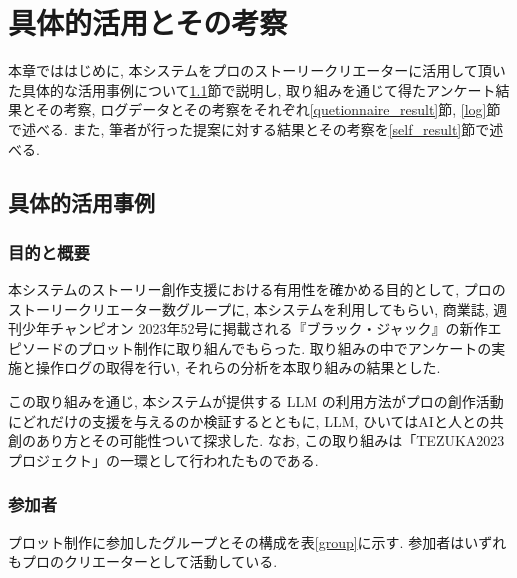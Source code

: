\documentclass[a4j,12pt]{jsreport}
\begin{document}
\pagestyle{fancy}
\lhead{\rightmark}
\renewcommand{\chaptermark}[1]{\markboth{第\ \thechapter\ 章\ #1}{}}
\fi

\chapter{具体的活用とその考察}\label{chap:experiment}
本章でははじめに, 本システムをプロのストーリークリエーターに活用して頂いた具体的な活用事例について\ref{example}節で説明し, 取り組みを通じて得たアンケート結果とその考察, ログデータとその考察をそれぞれ\ref{quetionnaire_result}節, \ref{log}節で述べる. また, 筆者が行った提案に対する結果とその考察を\ref{self_result}節で述べる.
\section{具体的活用事例}\label{example}
\subsection{目的と概要}\label{outline}
本システムのストーリー創作支援における有用性を確かめる目的として, プロのストーリークリエーター数グループに, 本システムを利用してもらい, 商業誌, 週刊少年チャンピオン\footnotemark{} 2023年52号に掲載される『ブラック・ジャック』の新作エピソードのプロット制作に取り組んでもらった. 取り組みの中でアンケートの実施と操作ログの取得を行い, それらの分析を本取り組みの結果とした.

この取り組みを通じ, 本システムが提供する LLM の利用方法がプロの創作活動にどれだけの支援を与えるのか検証するとともに, LLM, ひいてはAIと人との共創のあり方とその可能性ついて探求した. なお, この取り組みは「TEZUKA2023プロジェクト」の一環として行われたものである.
\subsection{参加者}\label{purpose}
プロット制作に参加したグループとその構成を表\ref{group}に示す. 参加者はいずれもプロのクリエーターとして活動している.
\end{document}
